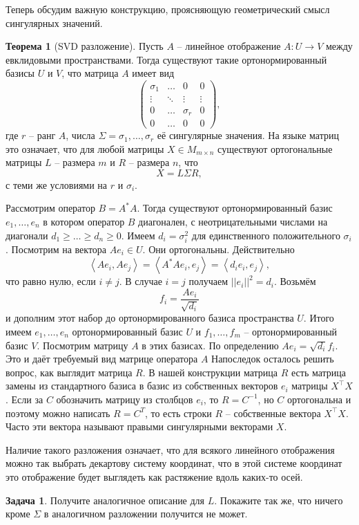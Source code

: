 \documentclass[10pt,a4paper,oneside]{book}
\theoremstyle{definition}
\newtheorem{zad}{{\color{violet!100!black} Задача}}
\newtheorem{thm}{{\color{red!40!black} Теорема}}
\def\lan{\left\langle }
\def\ran{\right\rangle}
\def\thrm{\begin{thm}}
\def\ethrm{\end{thm}}
\def\zd{\begin{zad}}
\def\ezd{\end{zad}}
\def\pmat{\begin{pmatrix}}
\def\epmat{\end{pmatrix}}
\begin{document}
Теперь обсудим важную конструкцию, проясняющую геометрический смысл сингулярных значений.


\thrm[SVD разложение] Пусть $A$ -- линейное отображение $A\colon U \to V$ между евклидовыми пространствами. Тогда существуют такие ортонормированный базисы $U$ и $V$, что матрица $A$ имеет вид 
$$\pmat \sigma_1 &\dots& 0 & 0\\
 \vdots & \ddots &\vdots & \vdots\\
 0 & \dots & \sigma_r & 0\\
 0 &  \dots & 0 & 0 \epmat,$$
 где $r$ -- ранг $A$, числа $\Sigma=\sigma_1, \dots, \sigma_r$ её сингулярные значения.
На языке матриц это означает, что для любой матрицы $X \in M_{m\times n}$ существуют ортогональные матрицы $L$ -- размера $m$ и $R$ -- размера $n$,  что
$$X= L \Sigma R,$$
 с теми же условиями на $r$ и $\sigma_i$.
 
\proof Рассмотрим оператор $B = A^{*}A$. Тогда существуют ортонормированный базис $e_1,\dots,e_n$ в котором оператор $B$ диагонален, с неотрицательными числами на диагонали $d_1\geq\dots\geq d_n\geq 0$. Имеем  $d_i=\sigma_i^2$ для единственного положительного $\sigma_i$. 
Посмотрим на вектора $Ae_i \in U$. Они ортогональны. Действительно
$$\lan Ae_i, Ae_j\ran = \lan A^{*}Ae_i,e_j \ran = \lan d_i e_i,e_j\ran,$$
что равно нулю, если $i\neq j$. В случае $i=j$ получаем $||e_i||^2=d_i$. Возьмём 
$$f_i=\frac{Ae_i}{\sqrt{d_i}}$$
и дополним этот набор до ортонормированного базиса пространства $U$. Итого имеем $e_1,\dots,e_n$ ортонормированный базис $U$ и $f_1,\dots,f_m$ -- ортонормированный базис $V$.
Посмотрим матрицу $A$ в этих базисах. По определению $Ae_i=\sqrt{d_i}f_i$. Это и даёт требуемый вид матрице оператора $A$
Напоследок осталось решить вопрос, как выглядит матрица $R$. В нашей конструкции матрица $R$ есть матрица замены из стандартного базиса в базис из собственных векторов $e_i$ матрицы $X^{\top}X$. Если за $C$ обозначить матрицу из столбцов $e_i$, то $R=C^{-1}$, но $C$ ортогональна и поэтому можно написать $R=C^{T}$, то есть строки $R$ -- собственные вектора $X^{\top}X$. Часто эти вектора называют правыми сингулярными векторами $X$.

\endproof
\ethrm

Наличие такого разложения означает, что для всякого линейного отображения можно так выбрать декартову систему координат, что в этой системе координат это отображение будет выглядеть как растяжение вдоль каких-то осей.

\zd Получите аналогичное описание для $L$. Покажите так же, что ничего кроме $\Sigma$ в аналогичном разложении получится не может.
\ezd
\end{document}
